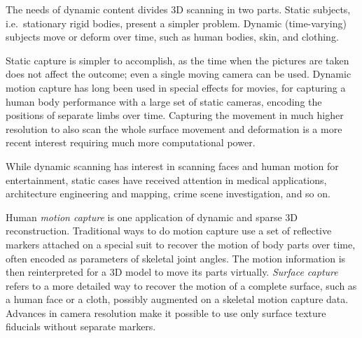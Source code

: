 
The needs of dynamic content divides 3D scanning in two parts.
Static subjects, i.e.\ stationary rigid bodies, present a simpler problem.
Dynamic (time-varying) subjects move or deform over time, such as human bodies, skin, and clothing.

Static capture is simpler to accomplish, as the time when the pictures are taken does not affect the outcome; even a single moving camera can be used.
Dynamic motion capture has long been used in special effects for movies, for capturing a human body performance with a large set of static cameras, encoding the positions of separate limbs over time.
Capturing the movement in much higher resolution to also scan the whole surface movement and deformation is a more recent interest requiring much more computational power.

While dynamic scanning has interest in scanning faces and human motion for entertainment, static cases have received attention in medical applications, architecture engineering and mapping, crime scene investigation, and so on.




Human \emph{motion capture} is one application of dynamic and sparse 3D reconstruction.
Traditional ways to do motion capture use a set of reflective markers attached on a special suit to recover the motion of body parts over time, often encoded as parameters of skeletal joint angles.
The motion information is then reinterpreted for a 3D model to move its parts virtually.
\emph{Surface capture} refers to a more detailed way to recover the motion of a complete surface, such as a human face or a cloth, possibly augmented on a skeletal motion capture data.
Advances in camera resolution make it possible to use only surface texture fiducials without separate markers.

